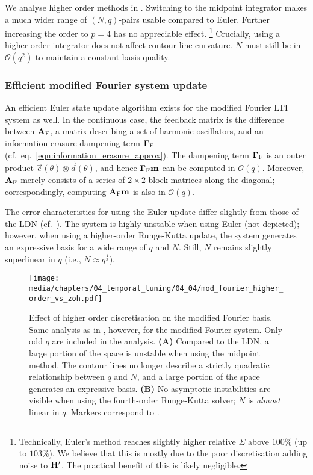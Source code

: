 We analyse higher order methods in .
Switching to the midpoint integrator makes a much wider range of $(N, q)$-pairs usable compared to Euler.
Further increasing the order to $p = 4$ has no appreciable effect.%
\footnote{Technically, Euler's method reaches slightly higher relative $\Sigma$ above $100\%$ (up to $103\%$). 
We believe that this is mostly due to the poor discretisation adding noise to $\mathbf{H}'$.
The practical benefit of this is likely negligible.}
Crucially, using a higher-order integrator does not affect contour line curvature. $N$ must still be in $\mathcal{O}(q^2)$ to maintain a constant basis quality.

\subsubsection{Efficient modified Fourier system update}

An efficient Euler state update algorithm exists for the modified Fourier LTI system as well.
In the continuous case, the feedback matrix is the difference between $\mathbf{A}_\mathrm{F}$, a matrix describing a set of harmonic oscillators, and an information erasure dampening term $\mathbf{\Gamma}_\mathrm{F}$ (cf.~eq.~\ref{eqn:information_erasure_approx}).
The dampening term $\mathbf{\Gamma}_\mathrm{F}$ is an outer product $\vec e(\theta) \otimes \vec d(\theta)$, and hence $\mathbf{\Gamma}_\mathrm{F} \mathbf{m}$ can be computed in $\mathcal{O}(q)$.
Moreover, $\mathbf{A}_\mathrm{F}$ merely consists of a series of $2 \times 2$ block matrices along the diagonal; correspondingly, computing $\mathbf{A}_\mathrm{F} \mathbf{m}$ is also in $\mathcal{O}(q)$.

The error characteristics for using the Euler update differ slightly from those of the LDN (cf.~).
The system is highly unstable when using Euler (not depicted); however, when using a higher-order Runge-Kutta update, the system generates an expressive basis for a wide range of $q$ and $N$.
Still, $N$ remains slightly superlinear in $q$ (i.e., $N \approx q^{\frac{4}3}$).

\begin{figure}
	\texttt{[image: media/chapters/04\_temporal\_tuning/04\_04/mod\_fourier\_higher\_order\_vs\_zoh.pdf]}
	\caption[Effect of higher order discretisation on the modified Fourier basis]{Effect of higher order discretisation on the modified Fourier basis. Same analysis as in , however, for the modified Fourier system.
	Only odd $q$ are included in the analysis.
	\textbf{(A)} Compared to the LDN, a large portion of the space is unstable when using the midpoint method.
	The contour lines no longer describe a strictly quadratic relationship between $q$ and $N$, and a large portion of the space generates an expressive basis.
	\textbf{(B)} No asymptotic instabilities are visible when using the fourth-order Runge-Kutta solver; $N$ is \emph{almost} linear in $q$.
	Markers correspond to .
	}
	\label{fig:mod_fourier_higher_order_vs_zoh}
\end{figure}

